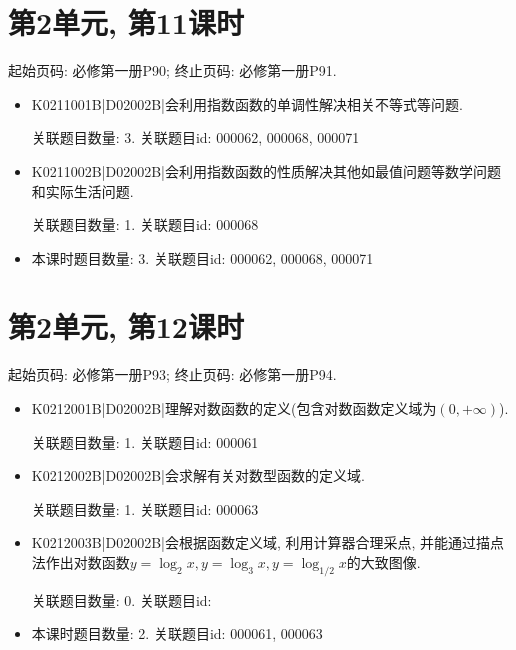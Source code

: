 \section*{第2单元, 第11课时}
起始页码: 必修第一册P90; 终止页码: 必修第一册P91.
\begin{itemize}
\item K0211001B|D02002B|会利用指数函数的单调性解决相关不等式等问题.

关联题目数量: 3. 关联题目id: 000062, 000068, 000071

\item K0211002B|D02002B|会利用指数函数的性质解决其他如最值问题等数学问题和实际生活问题.

关联题目数量: 1. 关联题目id: 000068

\item 本课时题目数量: 3. 关联题目id: 000062, 000068, 000071

\end{itemize}

\section*{第2单元, 第12课时}
起始页码: 必修第一册P93; 终止页码: 必修第一册P94.
\begin{itemize}
\item K0212001B|D02002B|理解对数函数的定义(包含对数函数定义域为$(0,+\infty)$).

关联题目数量: 1. 关联题目id: 000061

\item K0212002B|D02002B|会求解有关对数型函数的定义域.

关联题目数量: 1. 关联题目id: 000063

\item K0212003B|D02002B|会根据函数定义域, 利用计算器合理采点, 并能通过描点法作出对数函数$y=\log_2x,y=\log_3x,y=\log_{1/2}x$的大致图像.

关联题目数量: 0. 关联题目id: 

\item 本课时题目数量: 2. 关联题目id: 000061, 000063

\end{itemize}

